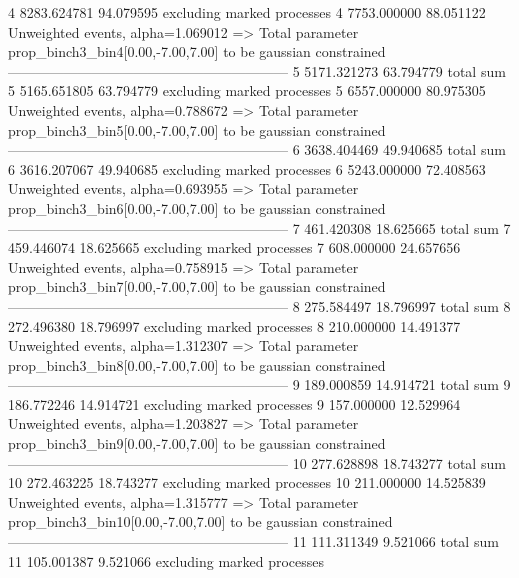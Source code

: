 4          8283.624781     94.079595       excluding marked processes    
4          7753.000000     88.051122       Unweighted events, alpha=1.069012
  => Total parameter prop_binch3_bin4[0.00,-7.00,7.00] to be gaussian constrained
------------------------------------------------------------
5          5171.321273     63.794779       total sum                     
5          5165.651805     63.794779       excluding marked processes    
5          6557.000000     80.975305       Unweighted events, alpha=0.788672
  => Total parameter prop_binch3_bin5[0.00,-7.00,7.00] to be gaussian constrained
------------------------------------------------------------
6          3638.404469     49.940685       total sum                     
6          3616.207067     49.940685       excluding marked processes    
6          5243.000000     72.408563       Unweighted events, alpha=0.693955
  => Total parameter prop_binch3_bin6[0.00,-7.00,7.00] to be gaussian constrained
------------------------------------------------------------
7          461.420308      18.625665       total sum                     
7          459.446074      18.625665       excluding marked processes    
7          608.000000      24.657656       Unweighted events, alpha=0.758915
  => Total parameter prop_binch3_bin7[0.00,-7.00,7.00] to be gaussian constrained
------------------------------------------------------------
8          275.584497      18.796997       total sum                     
8          272.496380      18.796997       excluding marked processes    
8          210.000000      14.491377       Unweighted events, alpha=1.312307
  => Total parameter prop_binch3_bin8[0.00,-7.00,7.00] to be gaussian constrained
------------------------------------------------------------
9          189.000859      14.914721       total sum                     
9          186.772246      14.914721       excluding marked processes    
9          157.000000      12.529964       Unweighted events, alpha=1.203827
  => Total parameter prop_binch3_bin9[0.00,-7.00,7.00] to be gaussian constrained
------------------------------------------------------------
10         277.628898      18.743277       total sum                     
10         272.463225      18.743277       excluding marked processes    
10         211.000000      14.525839       Unweighted events, alpha=1.315777
  => Total parameter prop_binch3_bin10[0.00,-7.00,7.00] to be gaussian constrained
------------------------------------------------------------
11         111.311349      9.521066        total sum                     
11         105.001387      9.521066        excluding marked processes    
